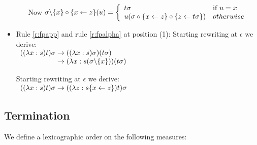 \documentclass[a4paper]{article}
\theoremstyle{definition}
\begin{document}
\begin{itemize}
\begin{itemize}
    Now $\sigma\backslash\{x\}\circ\{x \leftarrow z\}(u) =
    \left\{
    \begin{array}{ll}
      t\sigma & \mbox{if }u = x\\
      u(\sigma\circ\{x \leftarrow z\}\circ\{z \leftarrow t\sigma\})
              & otherwise \\
    \end{array}
    \right.
    $

  \end{itemize}

\item Rule \ref{r:fpapp} and rule \ref{r:fpalpha} at position (1):
  Starting rewriting at $\epsilon$ we derive:\\
  $
  \begin{array}{r@{\rewrites}l}
    ((\lambda x:s)t)\sigma & ((\lambda x:s)\sigma)(t\sigma) \\
                           & (\lambda x : s(\sigma \fpwithoutset{x}))(t\sigma) \\
  \end{array}
  $

  Starting rewriting at $\epsilon$ we derive:\\
  $
  \begin{array}{r@{\rewrites}l}
    ((\lambda x:s)t)\sigma & ((\lambda z:s\fpsubstin{x \fpwith z})t)\sigma\\
  \end{array}
  $

\end{itemize}

\subsection{Termination}
\label{sec:termination}

We define a lexicographic order on the following measures:
\end{document}
